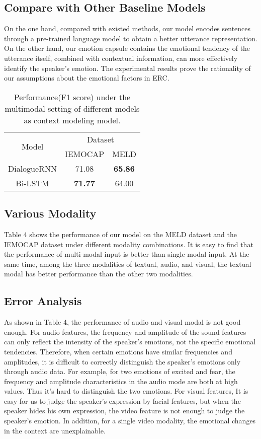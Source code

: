 \subsection{Compare with Other Baseline Models}
On the one hand, compared with existed methods, our model encodes sentences through a pre-trained language model to obtain a better utterance representation. On the other hand, our emotion capsule contains the emotional tendency of the utterance itself, combined with contextual information, can more effectively identify the speaker's emotion. The experimental results prove the rationality of our assumptions about the emotional factors in ERC.
\begin{table}[]
	\centering
	\begin{tabular}{c|c|c}
		\hline
		\multirow{2}{*}{Model} & \multicolumn{2}{c}{Dataset}    \\ \cline{2-3} 
		& IEMOCAP        & MELD           \\ \hline
		DialogueRNN            & 71.08          & \textbf{65.86} \\
		Bi-LSTM                & \textbf{71.77} & 64.00          \\ \hline
	\end{tabular}
	\caption{Performance(F1 score) under the multimodal setting of different models as context modeling model.}
\end{table}
\subsection{Various Modality}
Table 4 shows the performance of our model on the MELD dataset and the IEMOCAP dataset under different modality combinations. It is easy to find that the performance of multi-modal input is better than single-modal input. At the same time, among the three modalities of textual, audio, and visual, the textual modal has better performance than the other two modalities. 

\subsection{Error Analysis}
As shown in Table 4, the performance of audio and visual modal is not good enough. For audio features, the frequency and amplitude of the sound features can only reflect the intensity of the speaker's emotions, not the specific emotional tendencies. Therefore, when certain emotions have similar frequencies and amplitudes, it is difficult to correctly distinguish the speaker's emotions only through audio data. For example, for two emotions of excited and fear, the frequency and amplitude characteristics in the audio mode are both at high values. Thus it's hard to distinguish the two emotions. For visual features, It is easy for us to judge the speaker's expression by facial features, but when the speaker hides his own expression, the video feature is not enough to judge the speaker's emotion. In addition, for a single video modality, the emotional changes in the context are unexplainable. 

